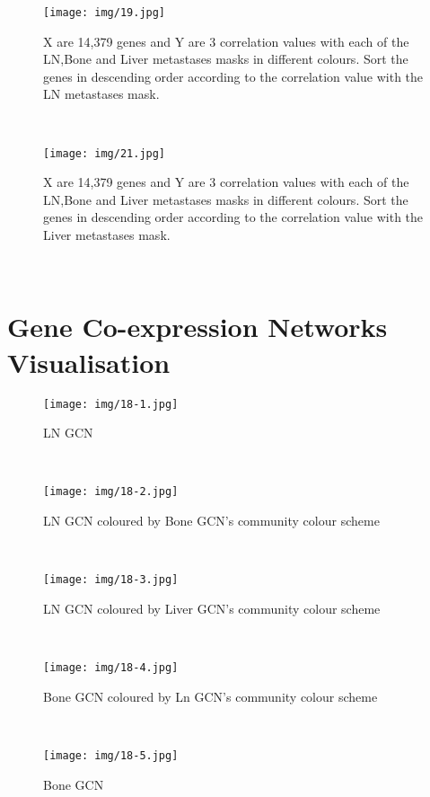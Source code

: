 \documentclass[12pt,a4paper]{report}
\begin{document}
\begin{figure}[h!]
\centering
\texttt{[image: img/19.jpg]}
\caption{X are 14,379 genes and Y are 3 correlation values with each of the LN,Bone and Liver metastases masks in different colours.  Sort the genes in descending order according to the correlation value with the LN metastases mask.}
\end{figure}\\

\begin{figure}[h!]
\centering
\texttt{[image: img/21.jpg]}
\caption{X are 14,379 genes and Y are 3 correlation values with each of the LN,Bone and Liver metastases masks in different colours.  Sort the genes in descending order according to the correlation value with the Liver metastases mask.}
\end{figure}\\

\newpage

\section{Gene Co-expression Networks Visualisation}

\begin{figure}[h!]
\centering
\texttt{[image: img/18-1.jpg]}
\caption{LN GCN }
\end{figure}\\

\begin{figure}[h!]
\centering
\texttt{[image: img/18-2.jpg]}
\caption{LN GCN coloured by Bone GCN's community colour scheme}
\end{figure}\\


\begin{figure}[h!]
\centering
\texttt{[image: img/18-3.jpg]}
\caption{LN GCN coloured by Liver GCN's community colour scheme}
\end{figure}\\


\begin{figure}[h!]
\centering
\texttt{[image: img/18-4.jpg]}
\caption{Bone GCN coloured by Ln GCN's community colour scheme}
\end{figure}\\


\begin{figure}[h!]
\centering
\texttt{[image: img/18-5.jpg]}
\caption{Bone GCN}
\end{figure}\\
\end{document}
